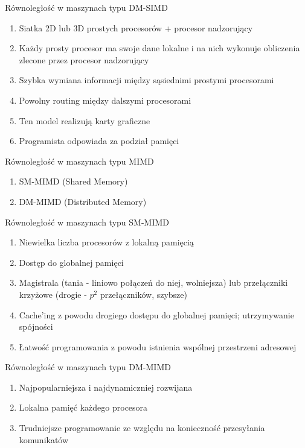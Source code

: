 \documentclass{beamer}
\begin{document}
\begin{frame}{Równoległość w maszynach typu DM-SIMD}
  \begin{enumerate}
  \item Siatka 2D lub 3D prostych procesorów + procesor nadzorujący
  \item Każdy prosty procesor ma swoje dane lokalne i na nich wykonuje obliczenia zlecone przez procesor nadzorujący
  \item Szybka wymiana informacji między sąsiednimi prostymi procesorami
  \item Powolny routing między dalszymi procesorami
  \item Ten model realizują karty graficzne
  \item Programista odpowiada za podział pamięci
  \end{enumerate}
\end{frame}

\begin{frame}{Równoległość w maszynach typu MIMD}
  \begin{enumerate}
  \item SM-MIMD (Shared Memory)
  \item DM-MIMD (Distributed Memory)
  \end{enumerate}
\end{frame}

\begin{frame}{Równoległość w maszynach typu SM-MIMD}
  \begin{enumerate}
  \item Niewielka liczba procesorów z lokalną pamięcią
  \item Dostęp do globalnej pamięci
  \item Magistrala (tania - liniowo połączeń do niej, wolniejsza) lub przełączniki krzyżowe (drogie - $p^2$ przełączników, szybsze)
  \item Cache'ing z powodu drogiego dostępu do globalnej pamięci; utrzymywanie spójności
  \item Łatwość programowania z powodu istnienia wspólnej przestrzeni adresowej
  \end{enumerate}
\end{frame}

\begin{frame}{Równoległość w maszynach typu DM-MIMD}
  \begin{enumerate}
  \item Najpopularniejsza i najdynamiczniej rozwijana
  \item Lokalna pamięć każdego procesora
  \item Trudniejsze programowanie ze względu na konieczność przesyłania komunikatów
  \end{enumerate}
\end{frame}
\end{document}
